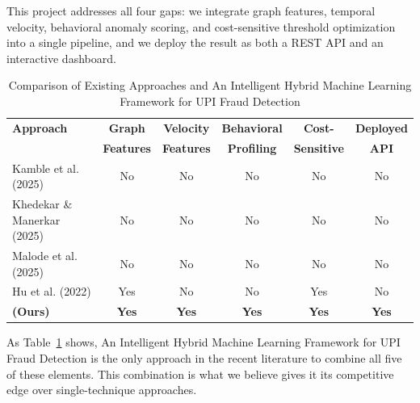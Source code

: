 This project addresses all four gaps: we integrate graph features, temporal velocity, behavioral anomaly scoring, and cost-sensitive threshold optimization into a single pipeline, and we deploy the result as both a REST API and an interactive dashboard.

\begin{table}[H]
\centering
\caption{Comparison of Existing Approaches and An Intelligent Hybrid Machine Learning Framework for UPI Fraud Detection}
\label{tab:literature_comparison}
\begin{tabular}{|p{3.5cm}|c|c|c|c|c|}
\hline
\textbf{Approach} & \textbf{Graph} & \textbf{Velocity} & \textbf{Behavioral} & \textbf{Cost-} & \textbf{Deployed}\\
 & \textbf{Features} & \textbf{Features} & \textbf{Profiling} & \textbf{Sensitive} & \textbf{API}\\
\hline
Kamble et al. (2025) & No & No & No & No & No\\
\hline
Khedekar \& Manerkar (2025) & No & No & No & No & No\\
\hline
Malode et al. (2025) & No & No & No & No & No\\
\hline
Hu et al. (2022) & Yes & No & No & Yes & No\\
\hline
\textbf{(Ours)} & \textbf{Yes} & \textbf{Yes} & \textbf{Yes} & \textbf{Yes} & \textbf{Yes}\\
\hline
\end{tabular}
\end{table}

As Table~\ref{tab:literature_comparison} shows, An Intelligent Hybrid Machine Learning Framework for UPI Fraud Detection is the only approach in the recent literature to combine all five of these elements. This combination is what we believe gives it its competitive edge over single-technique approaches.
